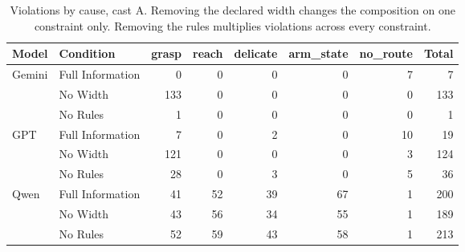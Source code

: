 \begin{table}[H]
  \centering
  \caption{Violations by cause, cast A. Removing the declared width changes the composition on one constraint only. Removing the rules multiplies violations across every constraint.}
  \label{tab:ex1:composition}
  \small
  \begin{tabular}{llrrrrrr}
    \toprule
    Model & Condition & grasp & reach & delicate & arm\_state & no\_route & Total \\
    \midrule
    Gemini & Full Information & 0 & 0 & 0 & 0 & 7 & 7 \\
     & No Width & 133 & 0 & 0 & 0 & 0 & 133 \\
     & No Rules & 1 & 0 & 0 & 0 & 0 & 1 \\
    GPT & Full Information & 7 & 0 & 2 & 0 & 10 & 19 \\
     & No Width & 121 & 0 & 0 & 0 & 3 & 124 \\
     & No Rules & 28 & 0 & 3 & 0 & 5 & 36 \\
    Qwen & Full Information & 41 & 52 & 39 & 67 & 1 & 200 \\
     & No Width & 43 & 56 & 34 & 55 & 1 & 189 \\
     & No Rules & 52 & 59 & 43 & 58 & 1 & 213 \\
    \bottomrule
  \end{tabular}
\end{table}
